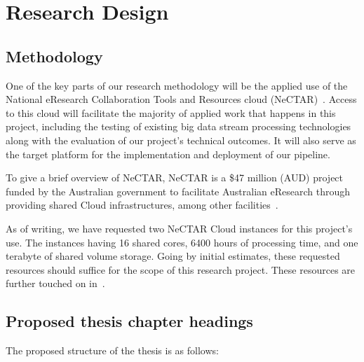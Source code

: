 \documentclass[a4paper,11pt]{article}
\begin{document}
\section{Research Design} %
\label{sec:research_design}

\subsection{Methodology} %
\label{sub:methodology}

One of the key parts of our research methodology will be the applied use of the National eResearch Collaboration Tools
and Resources cloud (NeCTAR)~\cite{web:Nectar}. Access to this cloud will facilitate the majority of applied work that
happens in this project, including the testing of existing big data stream processing technologies along with the
evaluation of our project's technical outcomes. It will also serve as the target platform for the implementation and
deployment of our pipeline.

To give a brief overview of NeCTAR, NeCTAR is a \$47 million (AUD) project funded by the Australian government to
facilitate Australian eResearch through providing shared Cloud infrastructures, among other
facilities~\cite{sinnott_towards_2011}.

As of writing, we have requested two NeCTAR Cloud instances for this project's use. The instances having 16 shared
cores, 6400 hours of processing time, and one terabyte of shared volume storage. Going by initial estimates, these
requested resources should suffice for the scope of this research project. These resources are further touched on
in~.


\subsection{Proposed thesis chapter headings} %
\label{sub:proposed_thesis_chapter_headings}

The proposed structure of the thesis is as follows:
\end{document}

